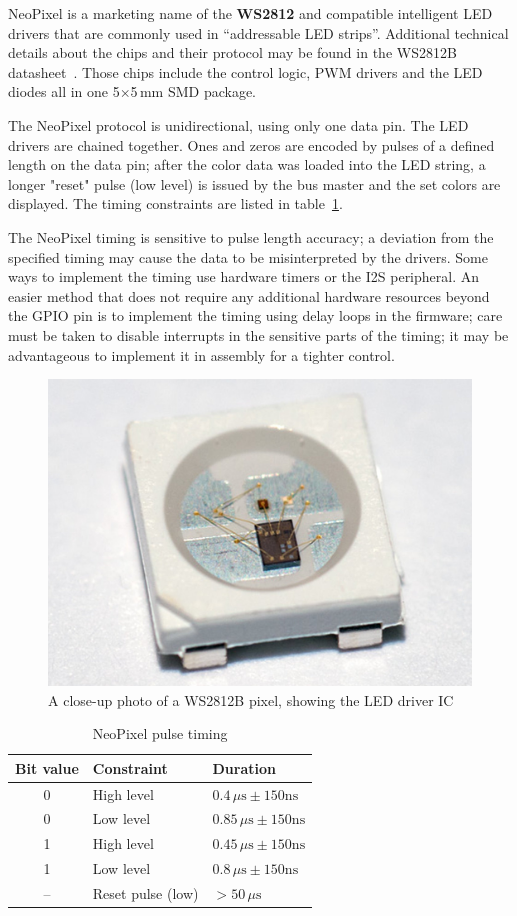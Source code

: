 NeoPixel is a marketing name of the \textbf{WS2812} and compatible intelligent \gls{LED} drivers that are commonly used in ``addressable \gls{LED} strips''. Additional technical details about the chips and their protocol may be found in the WS2812B datasheet~\cite{neopixel-ds}. Those chips include the control logic, PWM drivers and the \gls{LED} diodes all in one 5$\times$5\,mm SMD package.

The NeoPixel protocol is unidirectional, using only one data pin. The \gls{LED} drivers are chained together. Ones and zeros are encoded by pulses of a defined length on the data pin; after the color data was loaded into the \gls{LED} string, a longer "reset" pulse (low level) is issued by the bus master and the set colors are displayed. The timing constraints are listed in table~\ref{fig:ws2812-dia}.

The NeoPixel timing is sensitive to pulse length accuracy; a deviation from the specified timing may cause the data to be misinterpreted by the drivers. Some ways to implement the timing use hardware timers or the \gls{I2S} peripheral. An easier method that does not require any additional hardware resources beyond the \gls{GPIO} pin is to implement the timing using delay loops in the firmware; care must be taken to disable interrupts in the sensitive parts of the timing; it may be advantageous to implement it in assembly for a tighter control.

\begin{figure}[h]
	\centering
	\includegraphics[width=.5\textwidth] {img/ws2812b-detail.jpg}
	\caption{\label{fig:ws2812-detail}A close-up photo of a WS2812B pixel, showing the LED driver IC}
\end{figure}

\begin{table}[h]
	\centering
	\begin{tabular}{cll}
		\toprule
		\textbf{Bit value} & \textbf{Constraint} & \textbf{Duration} \\
		\midrule
		0 & High level & $0.4\,\mu\mathrm{s}\pm150\mathrm{ns}$ \\
		0 & Low level & $0.85\,\mu\mathrm{s}\pm150\mathrm{ns}$ \\
		1 & High level & $0.45\,\mu\mathrm{s}\pm150\mathrm{ns}$ \\
		1 & Low level & $0.8\,\mu\mathrm{s}\pm150\mathrm{ns}$ \\
		-- & Reset pulse (low) & $>50\,\mu\mathrm{s}$ \\
		\bottomrule
	\end{tabular}
	\caption{\label{fig:ws2812-dia}NeoPixel pulse timing}
\end{table}




